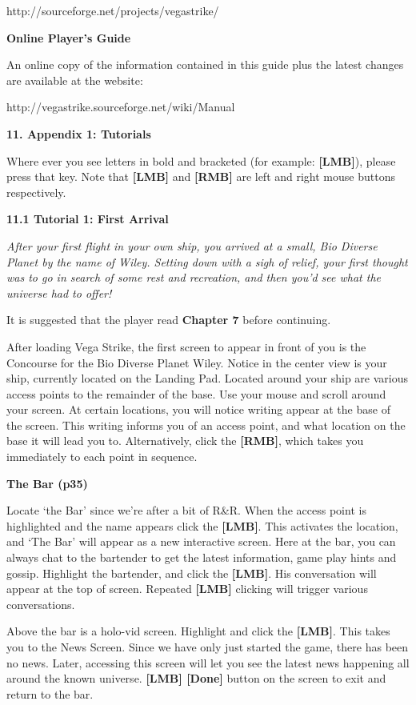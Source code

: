 \documentclass{article}
\begin{document}
http://sourceforge.net/projects/vegastrike/\textbf{}

\textbf{Online Player's Guide }

An online copy of the information contained in this guide plus the latest changes are available at the website: 

http://vegastrike.sourceforge.net/wiki/Manual



\eject \textbf{11. Appendix 1: Tutorials }

Where ever you see letters in bold and bracketed (for example: \textbf{[LMB]}), please press that key. Note that \textbf{[LMB]} and \textbf{[RMB]} are left and right mouse buttons respectively. 

\textbf{}

\textbf{11.1 Tutorial 1: First Arrival }

\textit{After your first flight in your own ship, you arrived at a small, Bio Diverse Planet by the name of Wiley.  Setting down with a sigh of relief, your first thought was to go in search of some rest and recreation, and then you'd see what the universe had to offer! }

It is suggested that the player read \textbf{Chapter 7} before continuing. 

After loading Vega Strike, the first screen to appear in front of you is the Concourse for the Bio Diverse Planet Wiley. Notice in the center view is your ship, currently located on the Landing Pad. Located around your ship are various access points to the remainder of the base. Use your mouse and scroll around your screen. At certain locations, you will notice writing appear at the base of the screen. This writing informs you of an access point, and what location on the base it will lead you to. Alternatively, click the \textbf{[RMB]}, which takes you immediately to each point in sequence. 

\textbf{The Bar (p35) }

Locate `the Bar' since we're after a bit of R\&R. When the access point is highlighted and the name appears click the \textbf{[LMB]}. This activates the location, and `The Bar' will appear as a new interactive screen. Here at the bar, you can always chat to the bartender to get the latest information, game play hints and gossip. Highlight the bartender, and click the \textbf{[LMB]}. His conversation will appear at the top of screen. Repeated \textbf{[LMB]} clicking will trigger various conversations. 

Above the bar is a holo-vid screen. Highlight and click the \textbf{[LMB]}. This takes you to the News Screen.  Since we have only just started the game, there has been no news. Later, accessing this screen will let you see the latest news happening all around the known universe. \textbf{[LMB] [Done] }button on the screen to exit and return to the bar. 
\end{document}
